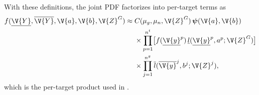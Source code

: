 With these definitions, the joint \ac{PDF} factorizes into per-target terms as
\begin{equation}
\begin{aligned}
f(\underline{\V{Y}},\overline{\V{Y}},\V{a},\V{b},\V{Z}^{G})
\approx{}& C(\mucgroup,\mu_n,\V{Z}^{G})\,\boldsymbol{\psi}(\V{a},\V{b})\\
&\times \prod_{p=1}^{n^t}\bigl[f(\underline{\V{y}}^{p})\,\underline{l}(\underline{\V{y}}^{p},a^{p};\V{Z}^{G})\bigr]\\
&\times \prod_{j=1}^{n^{g}}\overline{l}(\overline{\V{y}}^{j},b^{j};\V{Z}^{j}),
\end{aligned}
\label{eq:final_joint_pdf_local_factors}
\end{equation}
which is the per-target product used in .

